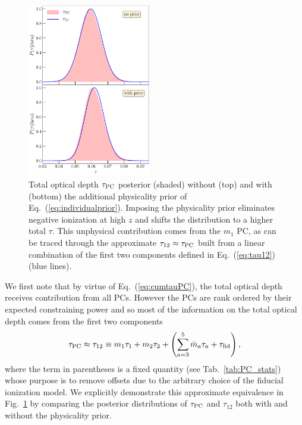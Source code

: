 \documentclass[aps,prd,twocolumn,amsmath,amssymb,showpacs,floatfix,superscriptaddress,nofootinbib]{revtex4-1}
\newcommand{\beq}{\begin{equation}}
\newcommand{\eeq}{\end{equation}}
\begin{document}
\begin{figure}[ht]
\includegraphics[width=0.48\textwidth]{plot_tau12_new_apply_cut_False_vs_True_pl18_pc_zmax30_pliklite_srollv2_1015_two_panels.pdf}
\caption{Total optical depth $\tau_{\rm PC}$ posterior (shaded) without (top) and with (bottom) the additional physicality prior of Eq.~(\ref{eq:individualprior}).  
Imposing the physicality prior eliminates negative ionization at high $z$ and shifts the distribution to a higher total $\tau$. This unphysical contribution comes from the $m_1$ PC, as can be traced through the approximate $\tau_{12} \approx \tau_{\rm PC}$ built from a linear combination of the first two components defined in Eq.~(\ref{eq:tau12}) (blue lines).}
\label{fig:tau12}
\end{figure}


 We first note that by virtue of Eq.~(\ref{eq:cumtauPC}), the total optical depth receives contribution from all PCs.  However the PCs are rank ordered by their expected constraining power and so most of the information on the total optical depth comes from
the first two components
\beq
\tau_{\rm PC} \approx \tau_{12} \equiv  m_1 \tau_1 + m_2 \tau_2 +
\left(\sum_{a=3}^5 \bar m_a \tau_a + \tau_{\rm fid}\right) ,
\label{eq:tau12}
\eeq
where the term in parentheses is a fixed quantity (see Tab.~\ref{tab:PC_stats}) whose purpose is to remove offsets due to the arbitrary choice of the fiducial ionization model.  We explicitly demonstrate this approximate equivalence in Fig.~\ref{fig:tau12} by comparing the
posterior distributions of $\tau_{\rm PC}$ and $\tau_{12}$ both with and without the physicality prior.  
\end{document}
